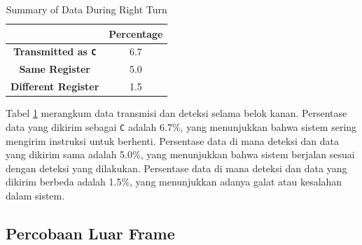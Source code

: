 \begin{table}[H]
    \centering
    \caption{Summary of Data During Right Turn}
    \label{tab:right_turn_data_transmission_detection}
    \begin{tabular}{|c|c|}
        \hline 
        \cellcolor[HTML]{000000} & \cellcolor[HTML]{C0C0C0} \textbf{Percentage}   \\ \hline
        \cellcolor[HTML]{C0C0C0} \textbf{Transmitted as \texttt{C}} & 6.7  \\ \hline
        \cellcolor[HTML]{C0C0C0} \textbf{Same Register}  & 5.0  \\ \hline
        \cellcolor[HTML]{C0C0C0} \textbf{Different Register}   & 1.5  \\ \hline
    \end{tabular}
\end{table}

Tabel \ref{tab:right_turn_data_transmission_detection} merangkum data transmisi dan deteksi selama belok kanan. Persentase data yang dikirim sebagai \texttt{C} adalah 6.7\%, yang menunjukkan bahwa sistem sering mengirim instruksi untuk berhenti. Persentase data di mana deteksi dan data yang dikirim sama adalah 5.0\%, yang menunjukkan bahwa sistem berjalan sesuai dengan deteksi yang dilakukan. Persentase data di mana deteksi dan data yang dikirim berbeda adalah 1.5\%, yang menunjukkan adanya galat atau kesalahan dalam sistem.

\newpage
\subsection{Percobaan Luar Frame}
\label{subsec:percobaanluarframe}

